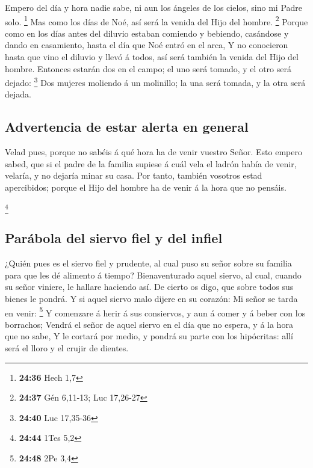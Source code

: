  Empero del día y hora nadie sabe, ni aun los ángeles de
los cielos, sino mi Padre solo. \footnote{\textbf{24:36} Hech 1,7}
 Mas como los días de Noé, así será la venida del Hijo del
hombre. \footnote{\textbf{24:37} Gén 6,11-13; Luc 17,26-27}
 Porque como en los días antes del diluvio estaban comiendo
y bebiendo, casándose y dando en casamiento, hasta el día que Noé entró
en el arca,  Y no conocieron hasta que vino el diluvio y
llevó á todos, así será también la venida del Hijo del hombre.
 Entonces estarán dos en el campo; el uno será tomado, y el
otro será dejado: \footnote{\textbf{24:40} Luc 17,35-36} 
Dos mujeres moliendo á un molinillo; la una será tomada, y la otra será
dejada.

\hypertarget{advertencia-de-estar-alerta-en-general}{%
\subsection{Advertencia de estar alerta en
general}\label{advertencia-de-estar-alerta-en-general}}

 Velad pues, porque no sabéis á qué hora ha de venir
vuestro Señor.  Esto empero sabed, que si el padre de la
familia supiese á cuál vela el ladrón había de venir, velaría, y no
dejaría minar su casa.  Por tanto, también vosotros estad
apercibidos; porque el Hijo del hombre ha de venir á la hora que no
pensáis.

\footnote{\textbf{24:44} 1Tes 5,2}

\hypertarget{paruxe1bola-del-siervo-fiel-y-del-infiel}{%
\subsection{Parábola del siervo fiel y del
infiel}\label{paruxe1bola-del-siervo-fiel-y-del-infiel}}

 ¿Quién pues es el siervo fiel y prudente, al cual puso su
señor sobre su familia para que les dé alimento á tiempo? 
Bienaventurado aquel siervo, al cual, cuando su señor viniere, le
hallare haciendo así.  De cierto os digo, que sobre todos
sus bienes le pondrá.  Y si aquel siervo malo dijere en su
corazón: Mi señor se tarda en venir: \footnote{\textbf{24:48} 2Pe 3,4}
 Y comenzare á herir á sus consiervos, y aun á comer y á
beber con los borrachos;  Vendrá el señor de aquel siervo
en el día que no espera, y á la hora que no sabe,  Y le
cortará por medio, y pondrá su parte con los hipócritas: allí será el
lloro y el crujir de dientes.

